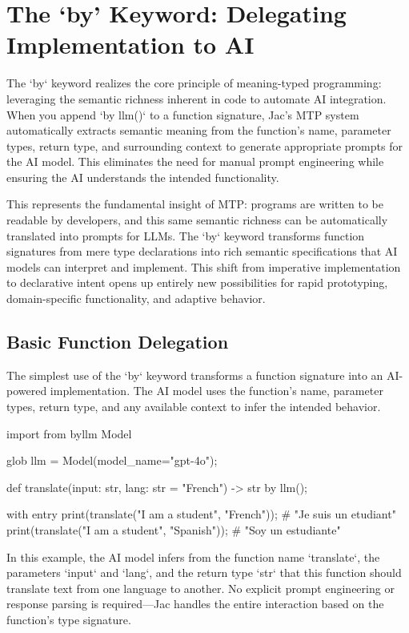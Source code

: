 \section{The `by' Keyword: Delegating Implementation to AI}

The `by` keyword realizes the core principle of meaning-typed programming: leveraging the semantic richness inherent in code to automate AI integration. When you append `by llm()` to a function signature, Jac's MTP system automatically extracts semantic meaning from the function's name, parameter types, return type, and surrounding context to generate appropriate prompts for the AI model. This eliminates the need for manual prompt engineering while ensuring the AI understands the intended functionality.

This represents the fundamental insight of MTP: programs are written to be readable by developers, and this same semantic richness can be automatically translated into prompts for LLMs. The `by` keyword transforms function signatures from mere type declarations into rich semantic specifications that AI models can interpret and implement. This shift from imperative implementation to declarative intent opens up entirely new possibilities for rapid prototyping, domain-specific functionality, and adaptive behavior.

\subsection{Basic Function Delegation}

The simplest use of the `by` keyword transforms a function signature into an AI-powered implementation. The AI model uses the function's name, parameter types, return type, and any available context to infer the intended behavior.

\begin{jacblock}
import from byllm { Model }

glob llm = Model(model_name="gpt-4o");

def translate(input: str, lang: str = "French") -> str by llm();

with entry {
    print(translate("I am a student", "French"));   # "Je suis un etudiant"
    print(translate("I am a student", "Spanish"));  # "Soy un estudiante"
}
\end{jacblock}

In this example, the AI model infers from the function name `translate`, the parameters `input` and `lang`, and the return type `str` that this function should translate text from one language to another. No explicit prompt engineering or response parsing is required—Jac handles the entire interaction based on the function's type signature.

